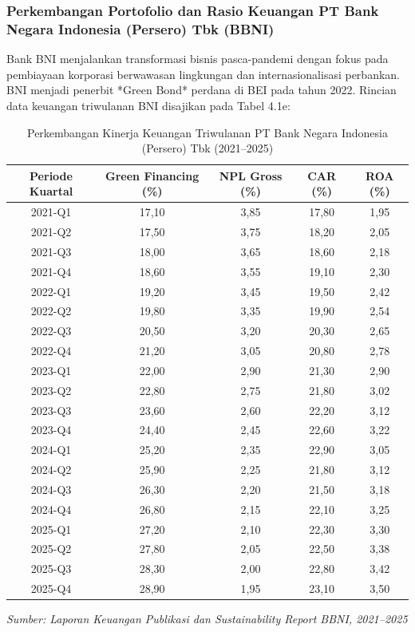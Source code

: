 \documentclass[12pt,a4paper]{article}
\numberwithin{equation}{section}
\begin{document}
\subsubsection{Perkembangan Portofolio dan Rasio Keuangan PT Bank Negara Indonesia (Persero) Tbk (BBNI)}
\noindent
Bank BNI menjalankan transformasi bisnis pasca-pandemi dengan fokus pada pembiayaan korporasi berwawasan lingkungan dan internasionalisasi perbankan. BNI menjadi penerbit *Green Bond* perdana di BEI pada tahun 2022. Rincian data keuangan triwulanan BNI disajikan pada Tabel 4.1e:

\begin{table}[H]
  \caption{Perkembangan Kinerja Keuangan Triwulanan PT Bank Negara Indonesia (Persero) Tbk (2021--2025)}
  \label{tab:kinerja_bbni}
  \small
  \begin{tabularx}{\textwidth}{|c|c|c|c|c|}
    \hline
    \textbf{Periode Kuartal} & \textbf{Green Financing (\%)} & \textbf{NPL Gross (\%)} & \textbf{CAR (\%)} & \textbf{ROA (\%)} \\
    \hline
    2021-Q1 & 17,10 & 3,85 & 17,80 & 1,95 \\
    2021-Q2 & 17,50 & 3,75 & 18,20 & 2,05 \\
    2021-Q3 & 18,00 & 3,65 & 18,60 & 2,18 \\
    2021-Q4 & 18,60 & 3,55 & 19,10 & 2,30 \\
    \hline
    2022-Q1 & 19,20 & 3,45 & 19,50 & 2,42 \\
    2022-Q2 & 19,80 & 3,35 & 19,90 & 2,54 \\
    2022-Q3 & 20,50 & 3,20 & 20,30 & 2,65 \\
    2022-Q4 & 21,20 & 3,05 & 20,80 & 2,78 \\
    \hline
    2023-Q1 & 22,00 & 2,90 & 21,30 & 2,90 \\
    2023-Q2 & 22,80 & 2,75 & 21,80 & 3,02 \\
    2023-Q3 & 23,60 & 2,60 & 22,20 & 3,12 \\
    2023-Q4 & 24,40 & 2,45 & 22,60 & 3,22 \\
    \hline
    2024-Q1 & 25,20 & 2,35 & 22,90 & 3,05 \\
    2024-Q2 & 25,90 & 2,25 & 21,80 & 3,12 \\
    2024-Q3 & 26,30 & 2,20 & 21,50 & 3,18 \\
    2024-Q4 & 26,80 & 2,15 & 22,10 & 3,25 \\
    \hline
    2025-Q1 & 27,20 & 2,10 & 22,30 & 3,30 \\
    2025-Q2 & 27,80 & 2,05 & 22,50 & 3,38 \\
    2025-Q3 & 28,30 & 2,00 & 22,80 & 3,42 \\
    2025-Q4 & 28,90 & 1,95 & 23,10 & 3,50 \\
    \hline
  \end{tabularx}
  \begin{flushleft}
    \textit{Sumber: Laporan Keuangan Publikasi dan Sustainability Report BBNI, 2021--2025}
  \end{flushleft}
\end{table}
\end{document}
